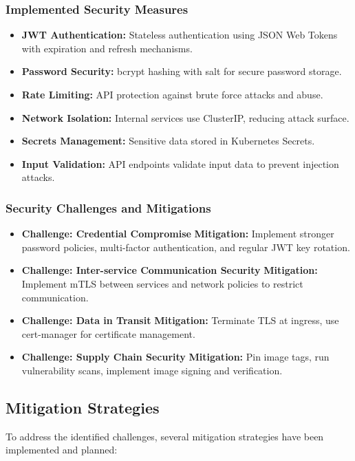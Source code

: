 \documentclass[conference]{IEEEtran}
\begin{document}
\subsubsection{Implemented Security Measures}
\begin{itemize}
  \item \textbf{JWT Authentication:} Stateless authentication using JSON Web Tokens with expiration and refresh mechanisms.
  \item \textbf{Password Security:} bcrypt hashing with salt for secure password storage.
  \item \textbf{Rate Limiting:} API protection against brute force attacks and abuse.
  \item \textbf{Network Isolation:} Internal services use ClusterIP, reducing attack surface.
  \item \textbf{Secrets Management:} Sensitive data stored in Kubernetes Secrets.
  \item \textbf{Input Validation:} API endpoints validate input data to prevent injection attacks.
\end{itemize}

\subsubsection{Security Challenges and Mitigations}
\begin{itemize}
  \item \textbf{Challenge: Credential Compromise}
  \textbf{Mitigation:} Implement stronger password policies, multi-factor authentication, and regular JWT key rotation.
  
  \item \textbf{Challenge: Inter-service Communication Security}
  \textbf{Mitigation:} Implement mTLS between services and network policies to restrict communication.
  
  \item \textbf{Challenge: Data in Transit}
  \textbf{Mitigation:} Terminate TLS at ingress, use cert-manager for certificate management.
  
  \item \textbf{Challenge: Supply Chain Security}
  \textbf{Mitigation:} Pin image tags, run vulnerability scans, implement image signing and verification.
\end{itemize}

\subsection{Mitigation Strategies}
To address the identified challenges, several mitigation strategies have been implemented and planned:
\end{document}
